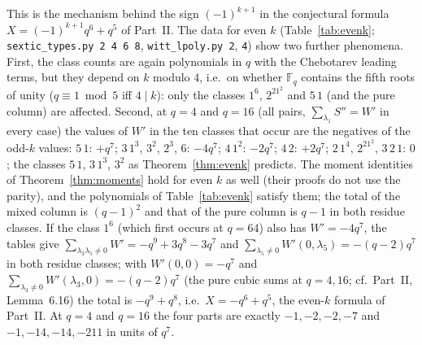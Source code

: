 \documentclass[12pt,a4paper]{amsart}
\theoremstyle{definition}
\newcommand{\F}{\mathbb{F}}
\newcommand{\Spp}{S''}
\begin{document}
This is the mechanism behind the sign $(-1)^{k+1}$ in the conjectural formula $X=(-1)^{k+1}q^6+q^5$ of Part~II. The data for even $k$ (Table~\ref{tab:evenk}; \texttt{sextic\_types.py 2 4 6 8}, \texttt{witt\_lpoly.py 2}, \texttt{4}) show two further phenomena. First, the class counts are again polynomials in $q$ with the Chebotarev leading terms, but they depend on $k$ modulo $4$, i.e.\ on whether $\F_q$ contains the fifth roots of unity ($q\equiv1\bmod5$ iff $4\mid k$): only the classes $1^6$, $2^21^2$ and $5\,1$ (and the pure column) are affected. Second, at $q=4$ and $q=16$ (all pairs, $\sum_{\lambda_1}\Spp=W'$ in every case) the values of $W'$ in the ten classes that occur are the negatives of the odd-$k$ values: $5\,1$: $+q^7$; $3\,1^3$, $3^2$, $2^3$, $6$: $-4q^7$; $4\,1^2$: $-2q^7$; $4\,2$: $+2q^7$; $2\,1^4$, $2^21^2$, $3\,2\,1$: $0$; the classes $5\,1$, $3\,1^3$, $3^2$ as Theorem~\ref{thm:evenk} predicts. The moment identities of Theorem~\ref{thm:moments} hold for even $k$ as well (their proofs do not use the parity), and the polynomials of Table~\ref{tab:evenk} satisfy them; the total of the mixed column is $(q-1)^2$ and that of the pure column is $q-1$ in both residue classes. If the class $1^6$ (which first occurs at $q=64$) also has $W'=-4q^7$, the tables give $\sum_{\lambda_3\lambda_5\ne0}W'=-q^9+3q^8-3q^7$ and $\sum_{\lambda_5\ne0}W'(0,\lambda_5)=-(q-2)q^7$ in both residue classes; with $W'(0,0)=-q^7$ and $\sum_{\lambda_3\ne0}W'(\lambda_3,0)=-(q-2)q^7$ (the pure cubic sums at $q=4,16$; cf.\ Part~II, Lemma~6.16) the total is $-q^9+q^8$, i.e.\ $X=-q^6+q^5$, the even-$k$ formula of Part~II. At $q=4$ and $q=16$ the four parts are exactly $-1,-2,-2,-7$ and $-1,-14,-14,-211$ in units of $q^7$.
\end{document}
